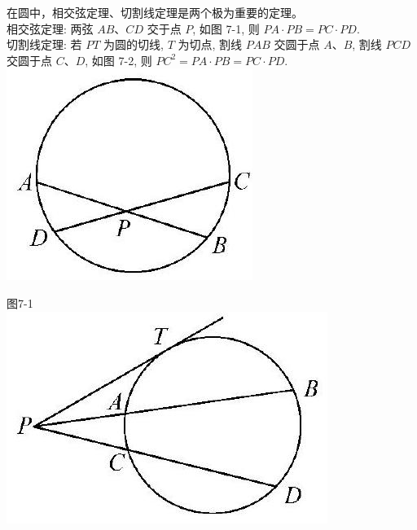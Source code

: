 \documentclass[10pt]{article}
\begin{document}
在圆中，相交弦定理、切割线定理是两个极为重要的定理。\\
相交弦定理: 两弦 $A B 、 C D$ 交于点 $P$, 如图 7-1, 则 $P A \cdot P B=P C \cdot P D$.\\
切割线定理: 若 $P T$ 为圆的切线, $T$ 为切点, 割线 $P A B$ 交圆于点 $A 、 B$, 割线 $P C D$ 交圆于点 $C 、 D$, 如图 7-2, 则 $P C^{2}=P A \cdot P B=P C \cdot P D$.\\
\includegraphics[max width=\textwidth, center]{2024_10_30_66b8e5e701da2093c133g-052(2)}

图7-1\\
\includegraphics[max width=\textwidth, center]{2024_10_30_66b8e5e701da2093c133g-052}
\end{document}
